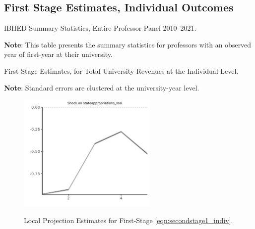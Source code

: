 \subsection{First Stage Estimates, Individual Outcomes}
\label{appendix:part1}

\begin{table}[H]
    \singlespacing
    \centering
    \caption{IBHED Summary Statistics, Entire Professor Panel 2010--2021.}
    \makebox[\textwidth][c]{}
    \label{tab:illinois-summary-rolling}
    \begin{flushleft}
        \footnotesize
        \textbf{Note}: This table presents the summary statistics for professors with an observed year of first-year at their university.
    \end{flushleft}
\end{table}

\begin{table}[H]
    \singlespacing
    \centering
    \caption{First Stage Estimates, for Total University Revenues at the Individual-Level.}
    \makebox[\textwidth][c]{}
    \label{tab:firststage-illinois}
    \begin{flushleft}
        \footnotesize
        \textbf{Note}: Standard errors are clustered at the university-year level.
    \end{flushleft}
\end{table}


\begin{figure}[H]
    \centering
    \singlespacing
    \caption{Local Projection Estimates for First-Stage \autoref{eqn:secondstage1_indiv}.}
    \includegraphics[width=0.6\textwidth]{figures/firststage-illinois-lp-rolling.png}
    \label{fig:firststage-illinois-lp}
\end{figure}


